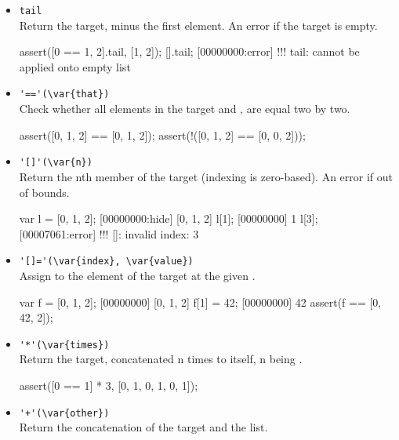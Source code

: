 \begin{itemize}
\item \lstinline|tail|\\
Return the target, minus the first element. An error if the target is
empty.

\begin{urbiscript}[firstnumber=last]
assert([0 == 1, 2].tail, [1, 2]);
[].tail;
[00000000:error] !!! tail: cannot be applied onto empty list
\end{urbiscript}

\item \lstinline|'=='(\var{that})|\\
Check whether all elements in the target and , are
equal two by two.

\begin{urbiscript}[firstnumber=last]
assert([0, 1, 2] == [0, 1, 2]);
assert(!([0, 1, 2] == [0, 0, 2]));
\end{urbiscript}

\item \lstinline|'[]'(\var{n})|\\
  Return the nth member of the target (indexing is zero-based). An
  error if out of bounds.

\begin{urbiscript}[firstnumber=last]
var l = [0, 1, 2];
[00000000:hide] [0, 1, 2]
l[1];
[00000000] 1
l[3];
[00007061:error] !!! []: invalid index: 3
\end{urbiscript}

\item \lstinline|'[]='(\var{index}, \var{value})|\\
  Assign  to the element of the target at the given
  .

\begin{urbiscript}[firstnumber=last]
var f = [0, 1, 2];
[00000000] [0, 1, 2]
f[1] = 42;
[00000000] 42
assert(f == [0, 42, 2]);
\end{urbiscript}

\item \lstinline|'*'(\var{times})|\\
Return the target, concatenated n times to itself, n being .

\begin{urbiscript}[firstnumber=last]
assert([0 == 1] * 3, [0, 1, 0, 1, 0, 1]);
\end{urbiscript}

\item \lstinline|'+'(\var{other})|\\
Return the concatenation of the target and the  list.


\end{itemize}
